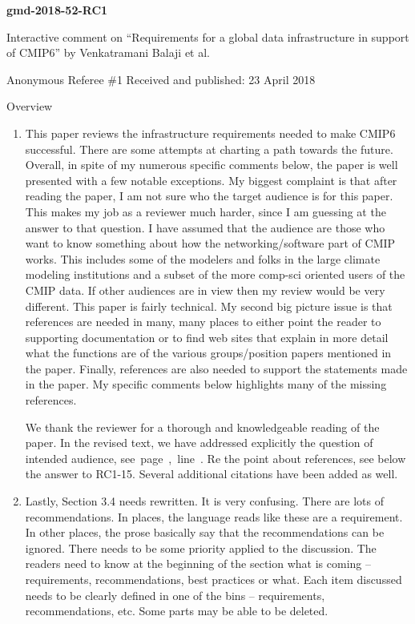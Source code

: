 \documentclass[gmd,manuscript]{copernicus}
\newcommand{\plref}[1]{\mbox{see page \pageref{p-#1}, line
    \lineref{l-#1}.}}
\newenvironment{answer}{\color{blue}}{}
\begin{document}
\pagebreak


\textbf{gmd-2018-52-RC1}

Interactive comment on “Requirements for a global data infrastructure
in support of CMIP6” by Venkatramani Balaji et al.

Anonymous Referee \#1
Received and published: 23 April 2018

Overview

\begin{enumerate}[label=RC1-Overview-\arabic*,leftmargin=*]
\item This paper reviews the infrastructure requirements needed to
  make CMIP6 successful. There are some attempts at charting a path
  towards the future. Overall, in spite of my numerous specific
  comments below, the paper is well presented with a few notable
  exceptions. My biggest complaint is that after reading the paper, I
  am not sure who the target audience is for this paper. This makes my
  job as a reviewer much harder, since I am guessing at the answer to
  that question. I have assumed that the audience are those who want
  to know something about how the networking/software part of CMIP
  works. This includes some of the modelers and folks in the large
  climate modeling institutions and a subset of the more comp-sci
  oriented users of the CMIP data. If other audiences are in view then
  my review would be very different. This paper is fairly technical.
  My second big picture issue is that references are needed in many,
  many places to either point the reader to supporting documentation
  or to find web sites that explain in more detail what the functions
  are of the various groups/position papers mentioned in the paper.
  Finally, references are also needed to support the statements made
  in the paper. My specific comments below highlights many of the
  missing references.

  \begin{answer}
    We thank the reviewer for a thorough and knowledgeable reading of
    the paper. In the revised text, we have addressed explicitly the
    question of intended audience, \plref{RC1-Overview-1} Re the point
    about references, see below the answer to RC1-15. Several
    additional citations have been added as well.
  \end{answer}
\item Lastly, Section 3.4 needs rewritten. It is very confusing. There
  are lots of recommendations. In places, the language reads like
  these are a requirement. In other places, the prose basically say
  that the recommendations can be ignored. There needs to be some
  priority applied to the discussion. The readers need to know at the
  beginning of the section what is coming – requirements,
  recommendations, best practices or what. Each item discussed needs
  to be clearly defined in one of the bins – requirements,
  recommendations, etc. Some parts may be able to be deleted.
\end{enumerate}
\end{document}

